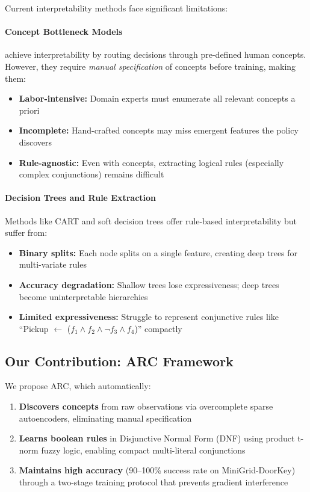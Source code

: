\documentclass[11pt,twocolumn]{article}
\begin{document}
Current interpretability methods face significant limitations:

\paragraph{Concept Bottleneck Models} \cite{koh2020concept} achieve interpretability by routing decisions through pre-defined human concepts. However, they require \emph{manual specification} of concepts before training, making them:
\begin{itemize}
\item \textbf{Labor-intensive:} Domain experts must enumerate all relevant concepts a priori
\item \textbf{Incomplete:} Hand-crafted concepts may miss emergent features the policy discovers
\item \textbf{Rule-agnostic:} Even with concepts, extracting logical rules (especially complex conjunctions) remains difficult
\end{itemize}

\paragraph{Decision Trees and Rule Extraction} Methods like CART \cite{breiman1984classification} and soft decision trees \cite{frosst2017distilling} offer rule-based interpretability but suffer from:
\begin{itemize}
\item \textbf{Binary splits:} Each node splits on a single feature, creating deep trees for multi-variate rules
\item \textbf{Accuracy degradation:} Shallow trees lose expressiveness; deep trees become uninterpretable hierarchies
\item \textbf{Limited expressiveness:} Struggle to represent conjunctive rules like ``Pickup $\leftarrow$ ($f_1 \land f_2 \land \lnot f_3 \land f_4$)'' compactly
\end{itemize}

\subsection{Our Contribution: ARC Framework}

We propose ARC, which automatically:
\begin{enumerate}
\item \textbf{Discovers concepts} from raw observations via overcomplete sparse autoencoders, eliminating manual specification
\item \textbf{Learns boolean rules} in Disjunctive Normal Form (DNF) using product t-norm fuzzy logic, enabling compact multi-literal conjunctions
\item \textbf{Maintains high accuracy} (90--100\% success rate on MiniGrid-DoorKey) through a two-stage training protocol that prevents gradient interference
\end{enumerate}
\end{document}
